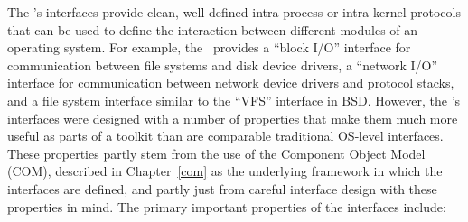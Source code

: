 %
% 
%
The \oskit's interfaces
provide clean, well-defined intra-process or intra-kernel protocols
that can be used to define the interaction
between different modules of an operating system.
For example, the \oskit\ provides a ``block I/O'' interface
for communication between file systems and disk device drivers,
a ``network I/O'' interface
for communication between network device drivers and protocol stacks,
and a file system interface similar to the ``VFS'' interface in BSD\@.
However, the \oskit's interfaces were designed with a number of properties
that make them much more useful as parts of a toolkit
than are comparable traditional OS-level interfaces.
These properties partly stem from the use of
the Component Object Model (COM), described in Chapter~\ref{com}
as the underlying framework in which the interfaces are defined,
and partly just from careful interface design with these properties in mind.
The primary important properties of the \oskit{} interfaces include:

